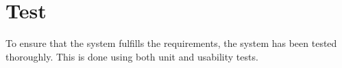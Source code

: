 \chapter{Test}\label{ch:Test}
To ensure that the system fulfills the requirements, the system has been tested thoroughly. This is done using both unit and usability tests.
